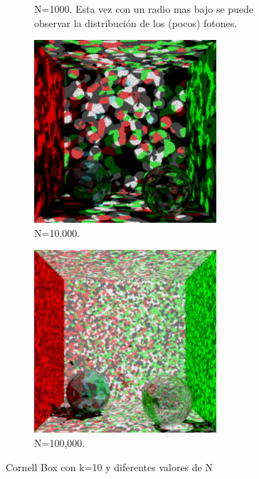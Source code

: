 \documentclass{article}
\begin{document}
\begin{figure}
\begin{subfigure}[h]{0.22\linewidth}
\caption{N=1000. Esta vez con un radio mas bajo se puede observar la distribución de los (pocos) fotones.}
\end{subfigure}
\hfill
\begin{subfigure}[h]{0.22\linewidth}
\includegraphics[width=\linewidth]{imgs/10k10k.png}
\caption{N=10,000.}
\end{subfigure}
\hfill
\begin{subfigure}[h]{0.22\linewidth}
\includegraphics[width=\linewidth]{imgs/100k10k.png}
\caption{N=100,000.}
\end{subfigure}

\caption{Cornell Box con k=10 y diferentes valores de N}
\end{figure}
\end{document}
